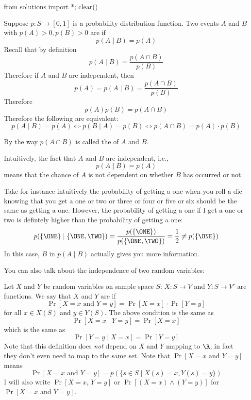 
\begin{python0}
from solutions import *; clear()
\end{python0}

Suppose $p : S \rightarrow [0,1]$ is a probability distribution function.
Two events $A$ and $B$ with $p(A)>0, p(B)>0$ are  if
\[
p(A \mid B) = p(A) 
\]
Recall that by definition
\[
p(A \mid B) = \frac{p(A \cap B)}{p(B)}
\]
Therefore if $A$ and $B$ are independent, then
\[
p(A) = p(A \mid B) = \frac{p(A \cap B)}{p(B)}
\]
Therefore
\[
  p(A)p(B) = p(A \cap B)
\]
Therefore the following are equivalent:
\[
  p(A \mid B) = p(A)
  \iff
  p(B \mid A) = p(B)
  \iff
  p(A \cap B) = p(A) \cdot p(B)
\]

By the way $p(A \cap B)$ is called the  of $A$ and $B$.

Intuitively, the fact that $A$ and $B$ are independent, i.e.,
\[
p(A \mid B) = p(A) 
\]
means that the chance of $A$ is not dependent on whether
$B$ has occurred or not.

Take for instance intuitively the probability of getting a one
when you roll a die knowing that you get a one or two or three or four
or five or six should be the same as getting a one.
However, the probability of getting a one if I get a one or two is defintely
higher than the probability of getting a one:
\begin{align*}
  p(\{\ONE\} \mid \{\ONE, \TWO\}) = \frac{p(\{\ONE\})}{p(\{\ONE, \TWO\})}
  = \frac{1}{2}
  \neq p(\{\ONE\})
\end{align*}
In this case, $B$ in $p(A \mid B)$ actually gives you more information.

You can also talk about the independence of two random variables:

\begin{defn}
  Let $X$ and $Y$ be random variables on sample space $S$:
  $X : S \rightarrow V$ and
  $Y : S \rightarrow V'$ are functions.
  We say that $X$ and $Y$ are  if
  \[
  \Pr[X=x \text{ and } Y=y] = \Pr[X=x] \cdot \Pr[Y=y]
  \]
  for all $x \in X(S)$ and $y \in Y(S)$.
  The above condition is the same as
  \[
    \Pr[X=x \mid Y = y] = \Pr[X=x]
  \]
  which is the same as
  \[
    \Pr[Y=y \mid X = x] = \Pr[Y=y]
  \]
  Note that this definition does \textit{not} depend on
  $X$ and $Y$ mapping to $\R$; in fact they don't even need to map to the same set.
  Note that
  $\Pr[X=x \text{ and } Y=y]$ means
  \[
    \Pr[X=x \text{ and } Y=y]
    = p(\{s\in S \mid X(s) = x, Y(s) = y \})
  \]
  I will also write
  $\Pr[X=x \text{, } Y=y]$ or
  $\Pr[(X=x) \land (Y=y)]$ for
  $\Pr[X=x \text{ and } Y=y]$.
\end{defn}

